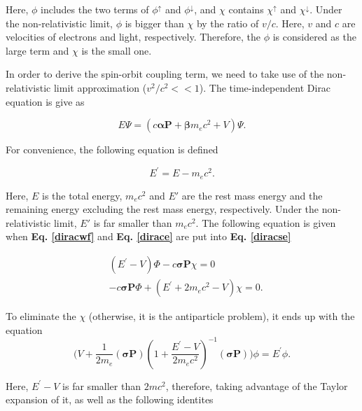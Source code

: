 \documentclass[a4paper, 12pt, titlepage,oneside,drop]{kthesis}
\begin{document}
\noindent Here, $\phi$ includes the two terms of $\phi^{\uparrow}$ and $\phi^{\downarrow}$, and $\chi$ contains  $\chi^{\uparrow}$ and $\chi^{\downarrow}$.
Under the non-relativistic limit, $\phi$ is bigger than $\chi$ by the ratio of $v/c$. Here, $v$ and $c$ are velocities of electrons and light, respectively.
Therefore, the $\phi$ is considered as the large term and $\chi$ is the small one.

\noindent In order to derive the spin-orbit coupling term, we need to take use of the non-relativistic limit approximation ($v^2/c^2 << 1$). The time-independent Dirac equation is give as

\begin{equation}\label{diracse}
 E \Psi = (c \boldsymbol{\alpha} \textbf{P} + \boldsymbol{\beta}m_ec^{2} + V) \Psi.
\end{equation}

\noindent For convenience, the following equation is defined

\begin{equation}\label{dirace}
E^{\prime} = E - m_ec^2.
\end{equation}

\noindent Here, $E$ is the total energy, $m_ec^2$ and $E'$ are the rest mass energy and the remaining energy excluding the rest mass energy, respectively. Under the non-relativistic limit, 
$E'$ is far smaller than $m_ec^2$. The following equation is given when \textbf{Eq. \ref{diracwf}} and \textbf{Eq. \ref{dirace}} are put into \textbf{Eq. \ref{diracse}}

\begin{equation}
\begin{split}
&(E^{\prime} - V) \Phi - c \boldsymbol{\sigma} \textbf{P} \chi = 0\\                
&-c\boldsymbol{\sigma} \textbf{P} \Phi + (E^{\prime}+2m_ec^2-V)\chi = 0.
\end{split}
\end{equation}

\noindent To eliminate the $\chi$ (otherwise, it is the antiparticle problem), it ends up with the equation
  \begin{equation}\label{soc1212}
\Big(V + \frac{1}{2m_e} (\boldsymbol{\sigma} \textbf{P}) (1+\frac{E^{\prime}-V}{2m_ec^2})^{-1} (\boldsymbol{\sigma} \textbf{P}) \Big)\phi=E^{\prime}\phi.
\end{equation}

\noindent Here, ${E^{\prime}-V}$ is far smaller than ${2mc^2}$, therefore, taking advantage of the Taylor expansion of it,  as well as the following identites
\end{document}
